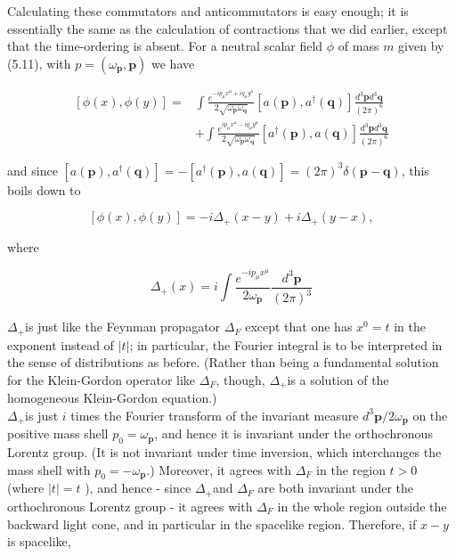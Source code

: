 \documentclass[10pt, letterpaper]{article}
\begin{document}
Calculating these commutators and anticommutators is easy enough; it is essentially the same as the calculation of contractions that we did earlier, except that the time-ordering is absent. For a neutral scalar field $\phi$ of mass $m$ given by (5.11), with $p=\left(\omega_{\mathbf{p}}, \mathbf{p}\right)$ we have

$$
\begin{aligned}
{[\phi(x), \phi(y)]=} & \int \frac{e^{-i p_{\mu} x^{\mu}+i q_{\mu} y^{\mu}}}{2 \sqrt{\omega_{\mathbf{p}} \omega_{\mathbf{q}}}}\left[a(\mathbf{p}), a^{\dagger}(\mathbf{q})\right] \frac{d^{3} \mathbf{p} d^{3} \mathbf{q}}{(2 \pi)^{6}} \\
& +\int \frac{e^{i p_{\mu} x^{\mu}-i q_{\mu} y^{\mu}}}{2 \sqrt{\omega_{\mathbf{p}} \omega_{\mathbf{q}}}}\left[a^{\dagger}(\mathbf{p}), a(\mathbf{q})\right] \frac{d^{3} \mathbf{p} d^{3} \mathbf{q}}{(2 \pi)^{6}}
\end{aligned}
$$

and since $\left[a(\mathbf{p}), a^{\dagger}(\mathbf{q})\right]=-\left[a^{\dagger}(\mathbf{p}), a(\mathbf{q})\right]=(2 \pi)^{3} \delta(\mathbf{p}-\mathbf{q})$, this boils down to

$$
[\phi(x), \phi(y)]=-i \Delta_{+}(x-y)+i \Delta_{+}(y-x),
$$

where

$$
\Delta_{+}(x)=i \int \frac{e^{-i p_{\mu} x^{\mu}}}{2 \omega_{\mathbf{p}}} \frac{d^{3} \mathbf{p}}{(2 \pi)^{3}}
$$

$\Delta_{+}$is just like the Feynman propagator $\Delta_{F}$ except that one has $x^{0}=t$ in the exponent instead of $|t|$; in particular, the Fourier integral is to be interpreted in the sense of distributions as before. (Rather than being a fundamental solution for the Klein-Gordon operator like $\Delta_{F}$, though, $\Delta_{+}$is a solution of the homogeneous Klein-Gordon equation.)\\
$\Delta_{+}$is just $i$ times the Fourier transform of the invariant measure $d^{3} \mathbf{p} / 2 \omega_{\mathbf{p}}$ on the positive mass shell $p_{0}=\omega_{\mathbf{p}}$, and hence it is invariant under the orthochronous Lorentz group. (It is not invariant under time inversion, which interchanges the mass shell with $p_{0}=-\omega_{\mathbf{p}}$.) Moreover, it agrees with $\Delta_{F}$ in the region $t>0$ (where $|t|=t$ ), and hence - since $\Delta_{+}$and $\Delta_{F}$ are both invariant under the orthochronous Lorentz group - it agrees with $\Delta_{F}$ in the whole region outside the backward light cone, and in particular in the spacelike region. Therefore, if $x-y$ is spacelike,
\end{document}
